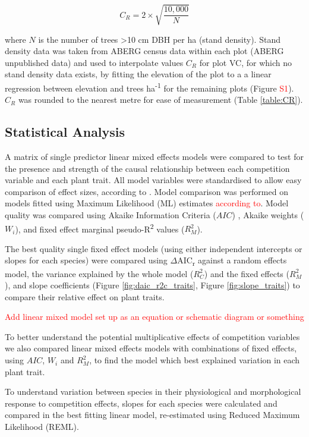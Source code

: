 \documentclass[a4paper,11pt]{article}
\newcommand{\todo}[1]{\textcolor{red}{#1}}   %
\begin{document}
\begin{equation}
\label{eq:CR}
C_R = 2 \times \sqrt{\frac{10,000}{N}}
\end{equation}

where $N$ is the number of trees \textgreater10 cm DBH per ha (stand density). Stand density data was taken from ABERG census data within each plot (ABERG unpublished data) and used to interpolate values $C_R$ for plot VC, for which no stand density data exists, by fitting the elevation of the plot to a a linear regression between elevation and trees ha\textsuperscript{-1} for the remaining plots (Figure \todo{S1}). $C_R$ was rounded to the nearest metre for ease of measurement (Table \ref{table:CR}). 

\subsection{Statistical Analysis}
A matrix of single predictor linear mixed effects models were compared to test for the presence and strength of the causal relationship between each competition variable and each plant trait. All model variables were standardised to allow easy comparison of effect sizes, according to \citep{Gelman2008, Grueber2011, Gelman2018}. Model comparison was performed on models fitted using Maximum Likelihood (ML) estimates \todo{according to}. Model quality was compared using Akaike Information Criteria ($AIC$) \citep{Akaike1992}, Akaike weights ($W_i$), and fixed effect marginal pseudo-R\textsuperscript{2} values ($R_M^2$). 

The best quality single fixed effect models (using either independent intercepts or slopes for each species) were compared using $\Delta$AIC\textsubscript{r} against a random effects model,  the variance explained by the whole model ($R_C^2$) and the fixed effects ($R_M^2$), and slope coefficients (Figure \ref{fig:daic_r2c_traits}, Figure \ref{fig:slope_traits}) to compare their relative effect on plant traits. 

\todo{Add linear mixed model set up as an equation or schematic diagram or something}

To better understand the potential multiplicative effects of competition variables we also compared linear mixed effects models with combinations of fixed effects, using $AIC$, $W_i$ and $R_M^2$, to find the model which best explained variation in each plant trait.

To understand variation between species in their physiological and morphological response to competition effects, slopes for each species were calculated and compared in the best fitting linear model, re-estimated using Reduced Maximum Likelihood (REML). 
\end{document}
